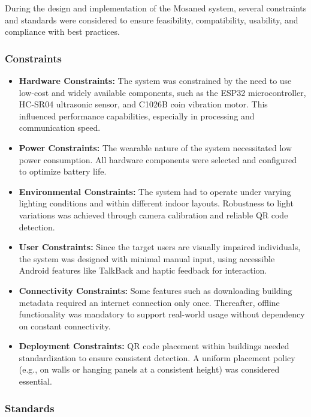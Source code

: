 During the design and implementation of the Mosaned system, several constraints and standards were considered to ensure feasibility, compatibility, usability, and compliance with best practices.

\subsubsection{Constraints}

\begin{itemize}
	\item \textbf{Hardware Constraints:} The system was constrained by the need to use low-cost and widely available components, such as the ESP32 microcontroller, HC-SR04 ultrasonic sensor, and C1026B coin vibration motor. This influenced performance capabilities, especially in processing and communication speed.
	
	\item \textbf{Power Constraints:} The wearable nature of the system necessitated low power consumption. All hardware components were selected and configured to optimize battery life.
	
	\item \textbf{Environmental Constraints:} The system had to operate under varying lighting conditions and within different indoor layouts. Robustness to light variations was achieved through camera calibration and reliable QR code detection.
	
	\item \textbf{User Constraints:} Since the target users are visually impaired individuals, the system was designed with minimal manual input, using accessible Android features like TalkBack and haptic feedback for interaction.
	
	\item \textbf{Connectivity Constraints:} Some features such as downloading building metadata required an internet connection only once. Thereafter, offline functionality was mandatory to support real-world usage without dependency on constant connectivity.
	
	\item \textbf{Deployment Constraints:} QR code placement within buildings needed standardization to ensure consistent detection. A uniform placement policy (e.g., on walls or hanging panels at a consistent height) was considered essential.
\end{itemize}

\subsubsection{Standards}

